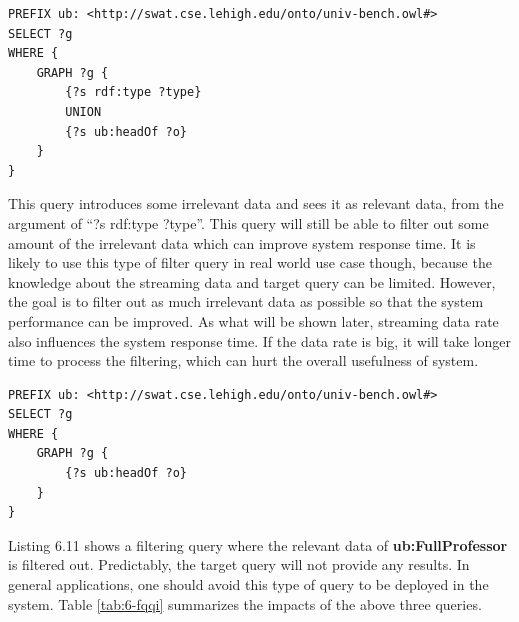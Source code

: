 \begin{lstlisting}[language=SPARQL,caption={Query Relevance Filtering Query 2},basicstyle=\small,frame=single]
PREFIX ub: <http://swat.cse.lehigh.edu/onto/univ-bench.owl#>
SELECT ?g
WHERE { 
    GRAPH ?g {
        {?s rdf:type ?type}
        UNION 
        {?s ub:headOf ?o}  
    }
}
\end{lstlisting}

This query introduces some irrelevant data and sees it as relevant data, from the argument of ``?s rdf:type ?type''.
This query will still be able to filter out some amount of the irrelevant data which can improve system response time.
It is likely to use this type of filter query in real world use case though, because the knowledge about the streaming data and target query can be limited. 
However, the goal is to filter out as much irrelevant data as possible so that the system performance can be improved.
As what will be shown later, streaming data rate also influences the system response time. 
If the data rate is big, it will take longer time to process the filtering, which can hurt the overall usefulness of system.

\begin{lstlisting}[language=SPARQL,caption={Query Relevance Filtering Query 3},basicstyle=\small,frame=single]
PREFIX ub: <http://swat.cse.lehigh.edu/onto/univ-bench.owl#>
SELECT ?g
WHERE {
    GRAPH ?g {
    	{?s ub:headOf ?o}  
    }
}
\end{lstlisting}

Listing 6.11 shows a filtering query where the relevant data of \textbf{ub:FullProfessor} is filtered out.
Predictably, the target query will not provide any results. 
In general applications, one should avoid this type of query to be deployed in the system. 
Table \ref{tab:6-fqqi} summarizes the impacts of the above three queries. 

